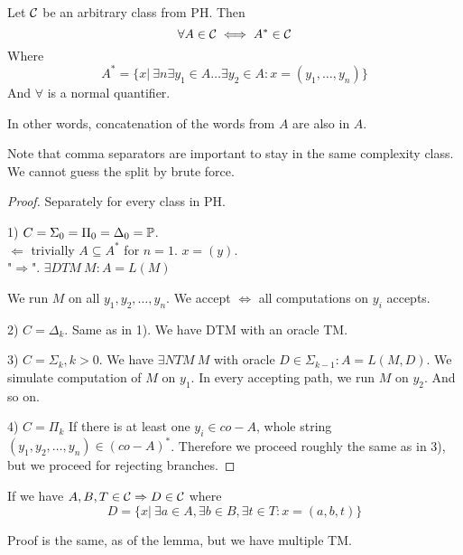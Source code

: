 
\begin{lemma}\label{concat}
	Let $\operatorname{\mathcal{C}}$ be an arbitrary class from PH.
	Then
	\[ \forall A \in \operatorname{\mathcal{C}} \iff A^{\ast} \in \operatorname{\mathcal{C}} \]
	Where
	\[ A^{\ast} = \{ x |\ \exists n \exists y_1 \in A \ldots \exists y_2 \in A: x = (y_1, \ldots, y_n) \} \]
	And $\forall$ is a normal quantifier.

	In other words, concatenation of the words from $A$ are also in $A$.

	Note that comma separators are important to stay in the same complexity class.
	We cannot guess the split by brute force.
\end{lemma}
\begin{proof} Separately for every class in PH.

	1) $C = \Sigma_0 = \Pi_0 = \Delta_0 = \operatorname{\mathbb{P}}$.\\
	$\Leftarrow$ trivially $A \subseteq A^{\ast}$ for $n = 1$.
	$x = (y)$.\\
	"$\Rightarrow$". $\exists DTM\ M: A = L(M)$

	We run $M$ on all $y_1, y_2, \ldots, y_n$.
	We accept $\iff$ all computations on $y_i$ accepts.

	2) $C = \Delta_k$.
	Same as in 1). We have DTM with an oracle TM.

	3) $C = \Sigma_k, k > 0$.
	We have
	$ \exists NTM\ M$ with oracle $D \in \Sigma_{k - 1}: A = L(M, D)$.
	We simulate computation of $M$ on $y_1$.
	In every accepting path, we run $M$ on $y_2$. And so on.

	4) $C = \Pi_k$
	If there is at least one $y_i \in co-A$, whole string $(y_1, y_2, \ldots, y_n) \in (co-A)^{\ast}$.
	Therefore we proceed roughly the same as in 3), but we proceed for rejecting branches.
\end{proof}

\begin{consequence}\label{concat_cons}
	If we have $A,B,T \in \operatorname{\mathcal{C}} \Rightarrow D \in \operatorname{\mathcal{C}}$ where
	\[ D = \{ x |\ \exists a \in A, \exists b \in B, \exists t \in T: x = (a, b, t) \} \]

	Proof is the same, as of the lemma, but we have multiple TM.
\end{consequence}


